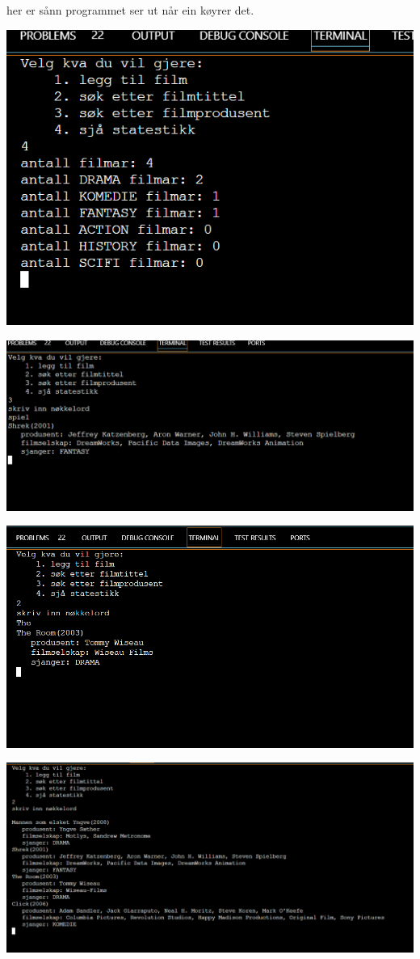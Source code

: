 \documentclass{article}
\begin{document}
her er sånn programmet ser ut når ein køyrer det.

\includegraphics[scale=0.5]{Skjermbilde 2025-01-31 180318.png}

\includegraphics[scale=0.5]{Skjermbilde 2025-01-31 180333.png}

\includegraphics[scale=0.5]{Skjermbilde 2025-01-31 180403.png}

\includegraphics[scale=0.5]{Skjermbilde 2025-01-31 180416.png}
\end{document}
